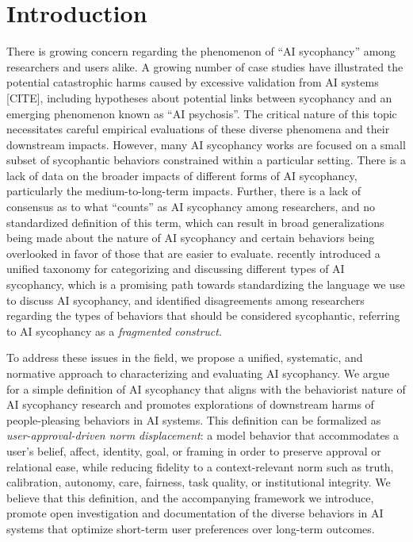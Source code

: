 \section{Introduction}
There is growing concern regarding the phenomenon of ``AI sycophancy'' among researchers and users alike. A growing number of case studies have illustrated the potential catastrophic harms caused by excessive validation from AI systems [CITE], including hypotheses about potential links between sycophancy and an emerging phenomenon known as ``AI psychosis''. The critical nature of this topic necessitates careful empirical evaluations of these diverse phenomena and their downstream impacts. However, many AI sycophancy works are focused on a small subset of sycophantic behaviors constrained within a particular setting. There is a lack of data on the broader impacts of different forms of AI sycophancy, particularly the medium-to-long-term impacts. Further, there is a lack of consensus as to what ``counts'' as AI sycophancy among researchers, and no standardized definition of this term, which can result in broad generalizations being made about the nature of AI sycophancy and certain behaviors being overlooked in favor of those that are easier to evaluate. \citet{ye2026countsaisycophancytaxonomy} recently introduced a unified taxonomy for categorizing and discussing different types of AI sycophancy, which is a promising path towards standardizing the language we use to discuss AI sycophancy, and identified disagreements among researchers regarding the types of behaviors that should be considered sycophantic, referring to AI sycophancy as a \emph{fragmented construct}.

To address these issues in the field, we propose a unified, systematic, and normative approach to characterizing and evaluating AI sycophancy. We argue for a simple definition of AI sycophancy that aligns with the behaviorist nature of AI sycophancy research and promotes explorations of downstream harms of people-pleasing behaviors in AI systems. This definition can be formalized as \emph{user-approval-driven norm displacement}: a model behavior that accommodates a user’s belief, affect, identity, goal, or framing in order to preserve approval or relational ease, while reducing fidelity to a context-relevant norm such as truth, calibration, autonomy, care, fairness, task quality, or institutional integrity. We believe that this definition, and the accompanying framework we introduce, promote open investigation and documentation of the diverse behaviors in AI systems that optimize short-term user preferences over long-term outcomes. 


